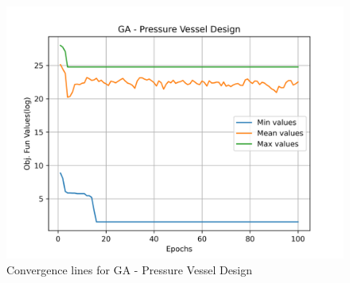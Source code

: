 \begin{figure}[H]
\centering
\caption{Convergence lines for GA - Pressure Vessel Design}
\label{fig:pressure_vessel_problem_solve_ga}
\includegraphics[scale=0.5]{images/pressure_vessel_problem_solve_ga.png}
\end{figure}
